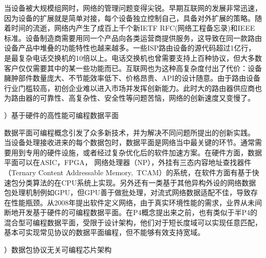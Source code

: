 当设备被大规模组网时，网络的管理问题变得尖锐。早期互联网的发展非常迅速，因为设备的扩展就是简单对接，每个设备独立控制自己，具备对外扩展的策略。随着时间的流逝，网络内产生了成百上千个新IETF RFC(网络工程备忘录)和IEEE标准。设备制造商需要用同一个产品向各类运营商提供服务，这导致在同一款路由设备产品中堆叠的功能特性也越来越多。一些ISP路由设备的源代码超过1亿行，是最复杂电话交换机的10倍以上。电话交换机也曾需要支持上百种协议，但大多数客户仅仅需要其中的某一些功能而已。互联网也为这种高复杂度付出了代价：设备臃肿部件数量庞大、不节能效率低下、价格昂贵、API的设计随意。由于路由设备行业门槛较高，初创企业难以进入市场并发挥创新能力。此时大的路由器供应商也为路由器的可靠性、高复杂性、安全性等问题苦恼，网络的创新速度又变慢了。

{）基于硬件的高性能可编程数据平面}



数据平面可编程概念引发了众多新技术，并为解决不同问题所提出的创新实践。
当设备处理接收进来的每个数据包时，数据平面是网络当中最关键的环节。通常需要用到专用的硬件设施，或者经过复杂优化后的软件加速方案。在硬件方面，数据平面可以在ASIC，FPGA， 网络处理器（NP），外挂有三态内容地址查找器件（Ternary Content Addressable Memory,~TCAM）的系统，在软件方面有基于快速包分类算法的在CPU系统上实现。另外还有一类基于其他异构外设的网络数据包处理机制例如GPU，但GPU善于做批处理，对流式网络数据适配不佳，导致存在性能瓶颈。从2008年提出软件定义网络，由于真实环境性能的需求，业界从未间断地开发基于硬件的可编程数据平面。在P4概念提出来之前，也有类似于半P4的混合型可编程数据平面，受限于设计架构，他们对于短长度域可以实现任意匹配，基本可实现常见协议的数据平面编程，但不能够有效支持宽域。

{）数据包协议无关可编程芯片架构}





